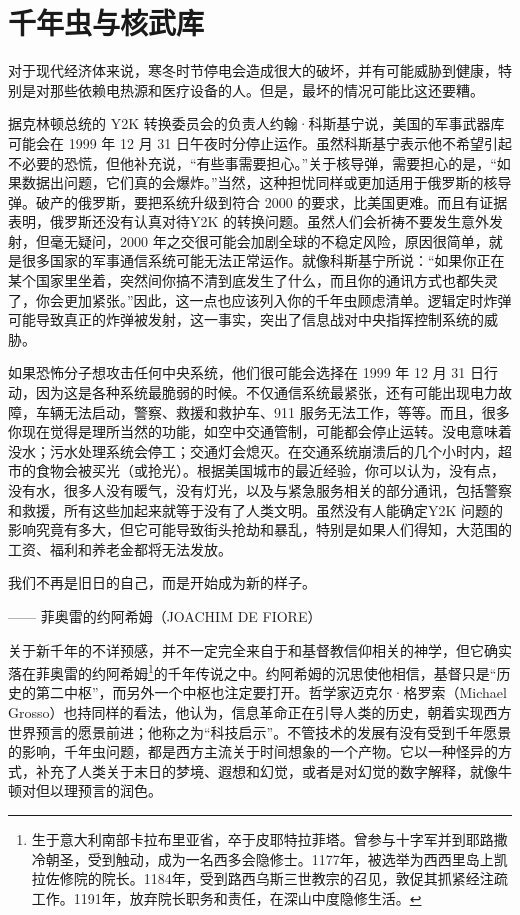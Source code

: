 \section{千年虫与核武库}
对于现代经济体来说，寒冬时节停电会造成很大的破坏，并有可能威胁到健康，特别是对那些依赖电热源和医疗设备的人。但是，最坏的情况可能比这还要糟。


据克林顿总统的 Y2K 转换委员会的负责人约翰·科斯基宁说，美国的军事武器库可能会在 1999 年 12 月 31 日午夜时分停止运作。虽然科斯基宁表示他不希望引起不必要的恐慌，但他补充说，“有些事需要担心。”关于核导弹，需要担心的是，“如果数据出问题，它们真的会爆炸。”当然，这种担忧同样或更加适用于俄罗斯的核导弹。破产的俄罗斯，要把系统升级到符合 2000 的要求，比美国更难。而且有证据表明，俄罗斯还没有认真对待Y2K 的转换问题。虽然人们会祈祷不要发生意外发射，但毫无疑问，2000 年之交很可能会加剧全球的不稳定风险，原因很简单，就是很多国家的军事通信系统可能无法正常运作。就像科斯基宁所说：“如果你正在某个国家里坐着，突然间你搞不清到底发生了什么，而且你的通讯方式也都失灵了，你会更加紧张。”因此，这一点也应该列入你的千年虫顾虑清单。逻辑定时炸弹可能导致真正的炸弹被发射，这一事实，突出了信息战对中央指挥控制系统的威胁。


如果恐怖分子想攻击任何中央系统，他们很可能会选择在 1999 年 12 月 31 日行动，因为这是各种系统最脆弱的时候。不仅通信系统最紧张，还有可能出现电力故障，车辆无法启动，警察、救援和救护车、911 服务无法工作，等等。而且，很多你现在觉得是理所当然的功能，如空中交通管制，可能都会停止运转。没电意味着没水；污水处理系统会停工；交通灯会熄灭。在交通系统崩溃后的几个小时内，超市的食物会被买光（或抢光）。根据美国城市的最近经验，你可以认为，没有点，没有水，很多人没有暖气，没有灯光，以及与紧急服务相关的部分通讯，包括警察和救援，所有这些加起来就等于没有了人类文明。虽然没有人能确定Y2K 问题的影响究竟有多大，但它可能导致街头抢劫和暴乱，特别是如果人们得知，大范围的工资、福利和养老金都将无法发放。


\begin{tcolorbox}
我们不再是旧日的自己，而是开始成为新的样子。
\begin{flushright}
—— 菲奥雷的约阿希姆（JOACHIM DE FIORE）
\end{flushright}
\end{tcolorbox}


关于新千年的不详预感，并不一定完全来自于和基督教信仰相关的神学，但它确实落在菲奥雷的约阿希姆\footnote{生于意大利南部卡拉布里亚省，卒于皮耶特拉菲塔。曾参与十字军并到耶路撒冷朝圣，受到触动，成为一名西多会隐修士。1177年，被选举为西西里岛上凯拉佐修院的院长。1184年，受到路西乌斯三世教宗的召见，敦促其抓紧经注疏工作。1191年，放弃院长职务和责任，在深山中度隐修生活。}的千年传说之中。约阿希姆的沉思使他相信，基督只是“历史的第二中枢”，而另外一个中枢也注定要打开。哲学家迈克尔·格罗索（Michael Grosso）也持同样的看法，他认为，信息革命正在引导人类的历史，朝着实现西方世界预言的愿景前进；他称之为“科技启示”。不管技术的发展有没有受到千年愿景的影响，千年虫问题，都是西方主流关于时间想象的一个产物。它以一种怪异的方式，补充了人类关于末日的梦境、遐想和幻觉，或者是对幻觉的数字解释，就像牛顿对但以理预言的润色。


